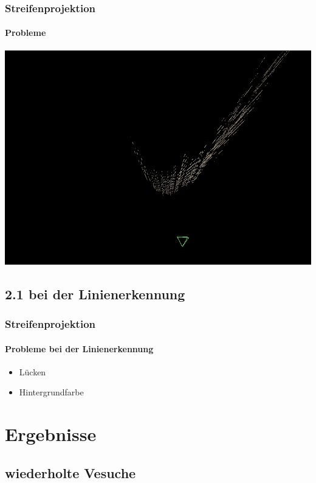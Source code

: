 \documentclass{beamer}
\begin{document}
\begin{frame}
	\frametitle{Streifenprojektion}
	\framesubtitle{Probleme}

	\includegraphics[width=\linewidth]{includes/krumm.png}

\end{frame}

\subsection{2.1 \hspace{5px} bei der Linienerkennung}
\begin{frame}
	\frametitle{Streifenprojektion}
	\framesubtitle{Probleme bei der Linienerkennung}

	\begin{itemize}
		\item Lücken
		\item Hintergrundfarbe
	\end{itemize}

\end{frame}

\section{Ergebnisse}

\subsection{wiederholte Vesuche}
\end{document}
